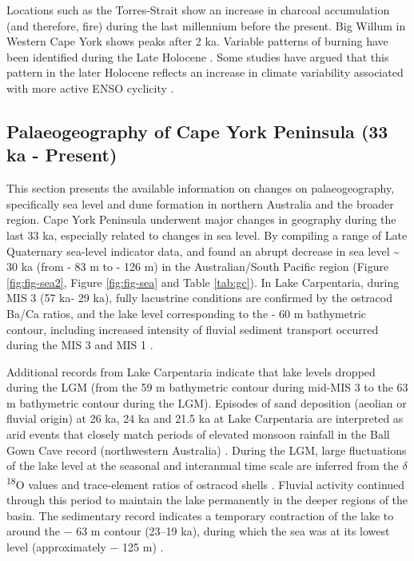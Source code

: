 \documentclass[
  12pt,
]{book}
\begin{document}
Locations such as the Torres-Strait \citep{roweLateHoloceneSwamp2015} show an increase in charcoal accumulation (and therefore, fire) during the last millennium before the present. Big Willum in Western Cape York shows peaks after 2 ka. Variable patterns of burning have been identified during the Late Holocene \citep{rowePalynologicalInvestigationHolocene2007, roweLateHoloceneSwamp2015, fieldCoherentPatternsEnvironmental2018, haberle23000yrPollen2005}. Some studies have argued that this pattern in the later Holocene reflects an increase in climate variability associated with more active ENSO cyclicity \citep{mooneyLateQuaternaryFire2011, kershawCompletePollenRecord2007}.

\hypertarget{palaeogeo}{%
\subsection{Palaeogeography of Cape York Peninsula (33 ka - Present)}\label{palaeogeo}}

This section presents the available information on changes on palaeogeography, specifically sea level and dune formation in northern Australia and the broader region. Cape York Peninsula underwent major changes in geography during the last 33 ka, especially related to changes in sea level. By compiling a range of Late Quaternary sea-level indicator data, \citet{brookePalaeoshorelinesAustralianContinental2017} and \citet{lambeckSeaLevelGlobal2014} found an abrupt decrease in sea level \textasciitilde{} 30 ka (from - 83 m to - 126 m) in the Australian/South Pacific region (Figure \ref{fig:fig-sea2}, Figure \ref{fig:fig-sea} and Table \ref{tab:gc}). In Lake Carpentaria, during MIS 3 (57 ka- 29 ka), fully lacustrine conditions are confirmed by the ostracod Ba/Ca ratios, and the lake level corresponding to the - 60 m bathymetric contour, including increased intensity of fluvial sediment transport occurred during the MIS 3 and MIS 1 \citep{reevesSedimentaryRecordPalaeoenvironments2008}.

Additional records from Lake Carpentaria indicate that lake levels dropped during the LGM (from the 59 m bathymetric contour during mid-MIS 3 to the 63 m bathymetric contour during the LGM). Episodes of sand deposition (aeolian or fluvial origin) at 26 ka, 24 ka and 21.5 ka at Lake Carpentaria are interpreted as arid events \citep{dedeckkerLateQuaternaryCyclic2001} that closely match periods of elevated monsoon rainfall in the Ball Gown Cave record (northwestern Australia) \citep{dennistonNorthAtlanticForcing2013}. During the LGM, large fluctuations of the lake level at the seasonal and interannual time scale are inferred from the \(\delta\)\textsuperscript{18}O values and trace-element ratios of ostracod shells \citep{devriendtLateQuaternaryEnvironment2011}. Fluvial activity continued through this period to maintain the lake permanently in the deeper regions of the basin. The sedimentary record indicates a temporary contraction of the lake to around the − 63 m contour (23--19 ka), during which the sea was at its lowest level (approximately − 125 m) \citep{brookePalaeoshorelinesAustralianContinental2017, yokoyamaShorelineReconstructionAustralia2001}.
\end{document}
